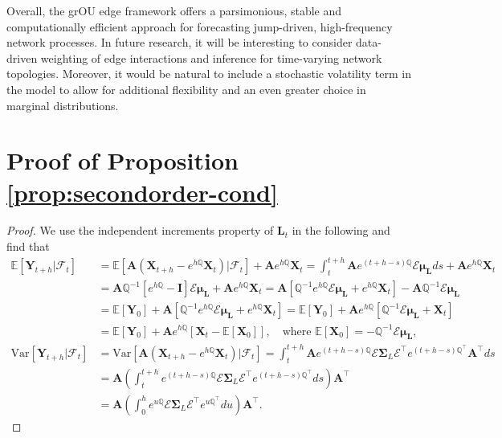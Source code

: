 \documentclass[12pt]{amsart}
\numberwithin{equation}{section}
\newcommand{\E}{\mathbb{E}}
\newcommand{\1}{\mathbf{1}}
\begin{document}
Overall, the grOU edge framework offers a parsimonious, stable and computationally efficient approach for forecasting jump-driven, high-frequency network processes. In future research, it will be interesting to consider data-driven weighting of edge interactions and inference for time-varying network topologies. Moreover, it would be natural to include a stochastic volatility term in the model to allow for additional flexibility and an even greater choice in marginal distributions.

\appendix
\section{Proof of Proposition \ref{prop:secondorder-cond}}
\label{prop_proof}
\begin{proof}
We use the independent increments property of $\textbf{L}_t$ in the following and find that 
\begin{align*}
    \mathbb{E}[\textbf{Y}_{t+h}\vert\mathcal{F}_t] &= \mathbb{E}\left[\textbf{A}(\mathbf{X}_{t+h}-e^{h\mathbb{Q}}\mathbf{X}_t)\vert\mathcal{F}_t\right] + \textbf{A}e^{h\mathbb{Q}}\mathbf{X}_{t}
    =\int_{t}^{t+h}\mathbf{A}e^{(t+h-s)\mathbb{Q}}\mathcal{E}\boldsymbol{\mu}_{\mathbf{L}}ds+\textbf{A}e^{h\mathbb{Q}}\mathbf{X}_{t}\\
    &=
\mathbf{A}\mathbb{Q}^{-1}\left[e^{h\mathbb{Q}}-\textbf{I}\right]\mathcal{E}\boldsymbol{\mu}_{\mathbf{L}} + \textbf{A}e^{h\mathbb{Q}}\mathbf{X}_{t}
=\mathbf{A}[\mathbb{Q}^{-1} e^{h\mathbb{Q}}\mathcal{E}\boldsymbol{\mu}_{\mathbf{L}} +e^{h\mathbb{Q}}\mathbf{X}_{t}]  
-\mathbf{A}\mathbb{Q}^{-1}\mathcal{E}\boldsymbol{\mu}_{\mathbf{L}}\\
&= \E[\mathbf{Y}_0]+\mathbf{A}[\mathbb{Q}^{-1} e^{h\mathbb{Q}}\mathcal{E}\boldsymbol{\mu}_{\mathbf{L}} +e^{h\mathbb{Q}}\mathbf{X}_{t}]=\E[\mathbf{Y}_0]+\mathbf{A}e^{h\mathbb{Q}}[\mathbb{Q}^{-1} \mathcal{E}\boldsymbol{\mu}_{\mathbf{L}} +\mathbf{X}_{t}]\\
&=\E[\mathbf{Y}_0]
+\mathbf{A}e^{h\mathbb{Q}}[\mathbf{X}_{t}-\E[\mathbf{X}_0]], \quad \mathrm{where}\,\, \E[\mathbf{X}_0]=-\mathbb{Q}^{-1} \mathcal{E}\boldsymbol{\mu}_{\mathbf{L}}, \\
    \text{Var}[\textbf{Y}_{t+h}\vert\mathcal{F}_t] &= \text{Var}\left[\textbf{A}(\mathbf{X}_{t+h}-e^{h\mathbb{Q}}\mathbf{X}_t)\vert\mathcal{F}_t\right]=\int_{t}^{t+h}\mathbf{A}e^{(t+h-s)\mathbb{Q}}\mathcal{E}\boldsymbol{\Sigma}_L\mathcal{E}^{\top} e^{(t+h-s)\mathbb{Q}^{\top}}\mathbf{A}^{\top} ds\\
    &=\mathbf{A} \left(\int_{t}^{t+h}e^{(t+h-s)\mathbb{Q}}\mathcal{E}\boldsymbol{\Sigma}_L\mathcal{E}^{\top} e^{(t+h-s)\mathbb{Q}^{\top}}ds\right)\mathbf{A}^{\top}\\    
    &=\mathbf{A} \left(\int_{0}^{h}e^{u\mathbb{Q}}\mathcal{E}\boldsymbol{\Sigma}_L\mathcal{E}^{\top} e^{u\mathbb{Q}^{\top}}du\right)\mathbf{A}^{\top}.
\end{align*}
\end{proof}
\end{document}
